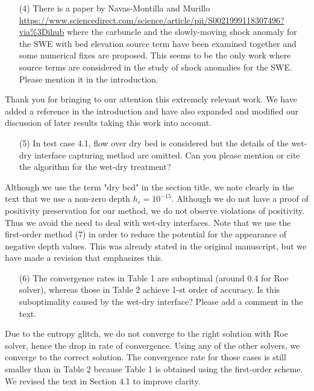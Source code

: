\documentclass[english,11pt]{article}
\begin{document}
\bigskip
{\color{OliveGreen}
  \begin{itemize}
  \item[(4)]
    There is a paper by Navas-Montilla and Murillo 
    \url{https://www.sciencedirect.com/science/article/pii/S0021999118307496?via\%3Dihub}
    where the carbuncle and the slowly-moving shock anomaly for the SWE with bed elevation source term 
    have been examined together and some numerical fixes are proposed. This seems to be the only work 
    where source terms are considered in the study of shock anomalies for the SWE. 
    Please mention it in the introduction.
  \end{itemize}
}
\noindent
Thank you for bringing to our attention this extremely relevant work.  We have added a reference in
the introduction and have also expanded and modified our discussion of later results taking
this work into account.

\bigskip
{\color{OliveGreen}
  \begin{itemize}
  \item[(5)]
    In test case 4.1, flow over dry bed is considered but the details of the wet-dry interface 
    capturing method are omitted. Can you please mention or cite the algorithm for the wet-dry treatment?
  \end{itemize}
}
\noindent
Although we use the term "dry bed" in the section title, we note clearly in the text that we
use a non-zero depth $h_r=10^{-15}$.  Although we do not have a proof of positivity preservation
for our method, we do not observe violations of positivity.  Thus we avoid the
need to deal with wet-dry interfaces.  Note that we use the first-order method
(7) in order to reduce the potential for the appearance of negative depth
values.  This was already stated in the original manuscript, but we have made a revision
that emphasizes this.


\bigskip
{\color{OliveGreen}
  \begin{itemize}
  \item[(6)]
    The convergence rates in Table 1 are suboptimal (around 0.4 for Roe solver), 
    whereas those in Table 2 achieve 1-st order of accuracy. Is this suboptimality caused by 
    the wet-dry interface? Please add a comment in the text.
  \end{itemize}
}
\noindent
Due to the entropy glitch, we do not converge to the right solution with Roe solver,
hence the drop in rate of convergence.
Using any of the other solvers, we converge to the correct solution. The convergence rate
for those cases is still smaller than in Table 2 because Table 1 is obtained using the first-order scheme. 
We revised the text in Section 4.1 to improve clarity. 
\end{document}
